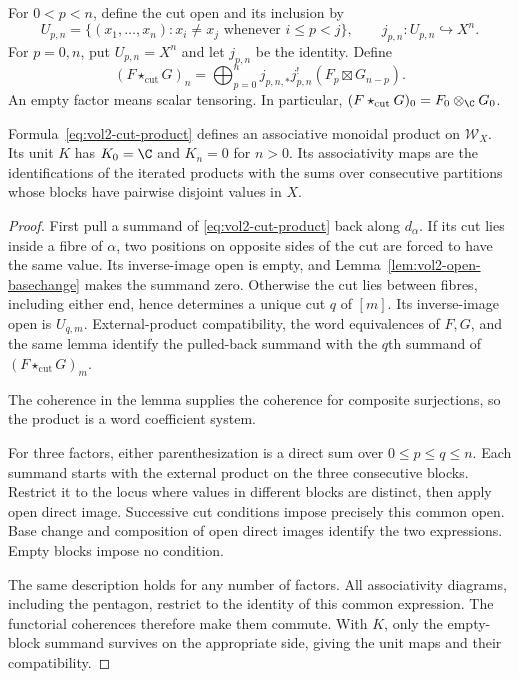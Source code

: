 For $0<p<n$, define the cut open and its inclusion by
\begin{equation}\label{eq:vol2-cut-open}
 U_{p,n}=\{(x_1,\ldots,x_n):x_i\ne x_j
                         \text{ whenever }i\leq p<j\},
 \qquad j_{p,n}:U_{p,n}\hookrightarrow X^n.
\end{equation}
For $p=0,n$, put $U_{p,n}=X^n$ and let $j_{p,n}$ be the identity.
Define
\begin{equation}\label{eq:vol2-cut-product}
 (F\star_{\mathrm{cut}}G)_n
 =\bigoplus_{p=0}^n j_{p,n,*}j_{p,n}^!
                  (F_p\boxtimes G_{n-p}).
\end{equation}
An empty factor means scalar tensoring. In particular,
$(F\star_{\mathrm{cut}}G)_0=F_0\otimes_\C G_0$.

\begin{theorem}\label{thm:vol2-cut-product}
Formula~\eqref{eq:vol2-cut-product} defines an associative monoidal
product on $\mathcal W_X$. Its unit $K$ has $K_0=\C$ and
$K_n=0$ for $n>0$. Its associativity maps are the identifications
of the iterated products with the sums over consecutive partitions
whose blocks have pairwise disjoint values in $X$.
\end{theorem}

\begin{proof}
First pull a summand of \eqref{eq:vol2-cut-product} back along
$d_\alpha$. If its cut lies inside a fibre of $\alpha$, two
positions on opposite sides of the cut are forced to have the same
value. Its inverse-image open is empty, and
Lemma~\ref{lem:vol2-open-basechange} makes the summand zero.
Otherwise the cut lies between fibres, including either end, hence
determines a unique cut $q$ of $[m]$. Its inverse-image open is
$U_{q,m}$. External-product compatibility, the word equivalences
of $F,G$, and the same lemma identify the pulled-back summand
with the $q$th summand of $(F\star_{\mathrm{cut}}G)_m$.

The coherence in the
lemma supplies the coherence for composite surjections, so the
product is a word coefficient system.

For three factors, either parenthesization is a direct sum over
$0\leq p\leq q\leq n$. Each summand starts with the external
product on the three consecutive blocks. Restrict it to the locus
where values in different blocks are distinct, then apply open
direct image. Successive cut conditions impose precisely this
common open. Base change and composition of open direct images
identify the two expressions. Empty blocks impose no condition.

The same description holds for any number of factors. All
associativity diagrams, including the pentagon, restrict to the
identity of this common expression. The functorial coherences
therefore make them commute. With $K$, only the empty-block
summand survives on the appropriate side, giving the unit maps
and their compatibility.
\end{proof}


